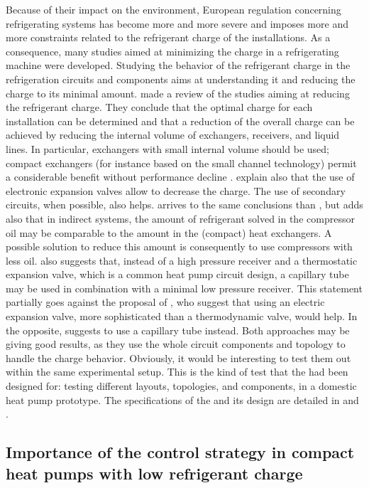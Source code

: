 Because of their impact on the environment, European regulation
concerning refrigerating systems has become more and more severe and
imposes more and more constraints related to the refrigerant charge of
the installations. As a consequence, many studies aimed at minimizing
the charge in a refrigerating machine were developed. Studying the
behavior of the refrigerant charge in the refrigeration circuits and
components aims at understanding it and reducing the charge to its
minimal amount. \citet{Poggi-Bontemps-2008a} made a review of the
studies aiming at reducing the refrigerant charge. They conclude that
the optimal charge for each installation can be determined and that a
reduction of the overall charge can be achieved by reducing the
internal volume of exchangers, receivers, and liquid lines. In
particular, exchangers with small internal volume should be used;
compact exchangers (for instance based on the small channel
technology) permit a considerable benefit without performance decline
\citep[p.\,367]{Poggi-Bontemps-2008a}. \citet{Poggi-Bontemps-2008a}
explain also that the use of electronic expansion valves allow to
decrease the charge. The use of secondary circuits, when possible,
also helps. \citet{Palm-2007a} arrives to the same conclusions than
\citet{Poggi-Bontemps-2008a}, but adds also that in indirect systems,
the amount of refrigerant solved in the compressor oil may be
comparable to the amount in the (compact) heat exchangers. A possible
solution to reduce this amount is consequently to use compressors with
less oil. \citep{Palm-2007a} also suggests that, instead of a high
pressure receiver and a thermostatic expansion valve, which is a
common heat pump circuit design, a capillary tube may be used in
combination with a minimal low pressure receiver. This statement
partially goes against the proposal of \citet{Poggi-Bontemps-2008a},
who suggest that using an electric expansion valve, more sophisticated
than a thermodynamic valve, would help. In the opposite,
\citep{Palm-2007a} suggests to use a capillary tube instead. Both
approaches may be giving good results, as they use the whole circuit
components and topology to handle the charge behavior. Obviously, it
would be interesting to test them out within the same experimental
setup. This is the kind of test that the \BWP{} had been designed for:
testing different layouts, topologies, and components, in a domestic
heat pump prototype. The specifications of the \BWP{} and its design
are detailed in  and .

\subsection{Importance of the control strategy in
  compact heat pumps with low refrigerant charge}
\label{sec:sota-control}

